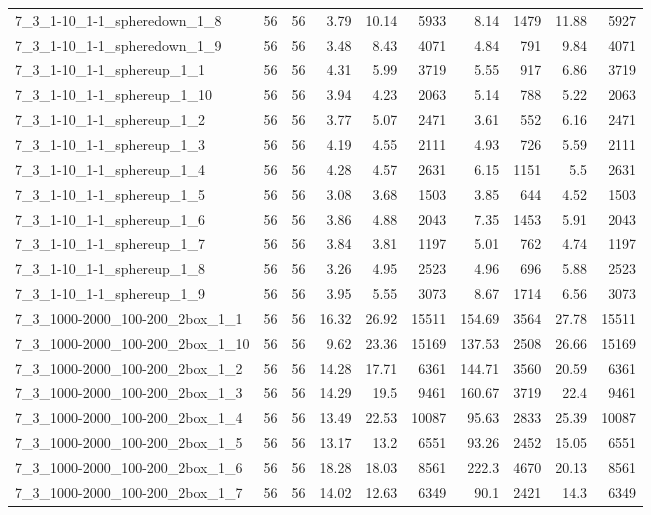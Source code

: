 \begin{center}
\begin{scriptsize}
\begin{longtable}{lrrrrrrrrr}
7\_3\_1-10\_1-1\_spheredown\_1\_8 & 56 & 56 & 3.79 & 10.14 & 5933 & 8.14 & 1479 & 11.88 & 5927\\
7\_3\_1-10\_1-1\_spheredown\_1\_9 & 56 & 56 & 3.48 & 8.43 & 4071 & 4.84 & 791 & 9.84 & 4071\\
7\_3\_1-10\_1-1\_sphereup\_1\_1 & 56 & 56 & 4.31 & 5.99 & 3719 & 5.55 & 917 & 6.86 & 3719\\
7\_3\_1-10\_1-1\_sphereup\_1\_10 & 56 & 56 & 3.94 & 4.23 & 2063 & 5.14 & 788 & 5.22 & 2063\\
7\_3\_1-10\_1-1\_sphereup\_1\_2 & 56 & 56 & 3.77 & 5.07 & 2471 & 3.61 & 552 & 6.16 & 2471\\
7\_3\_1-10\_1-1\_sphereup\_1\_3 & 56 & 56 & 4.19 & 4.55 & 2111 & 4.93 & 726 & 5.59 & 2111\\
7\_3\_1-10\_1-1\_sphereup\_1\_4 & 56 & 56 & 4.28 & 4.57 & 2631 & 6.15 & 1151 & 5.5 & 2631\\
7\_3\_1-10\_1-1\_sphereup\_1\_5 & 56 & 56 & 3.08 & 3.68 & 1503 & 3.85 & 644 & 4.52 & 1503\\
7\_3\_1-10\_1-1\_sphereup\_1\_6 & 56 & 56 & 3.86 & 4.88 & 2043 & 7.35 & 1453 & 5.91 & 2043\\
7\_3\_1-10\_1-1\_sphereup\_1\_7 & 56 & 56 & 3.84 & 3.81 & 1197 & 5.01 & 762 & 4.74 & 1197\\
7\_3\_1-10\_1-1\_sphereup\_1\_8 & 56 & 56 & 3.26 & 4.95 & 2523 & 4.96 & 696 & 5.88 & 2523\\
7\_3\_1-10\_1-1\_sphereup\_1\_9 & 56 & 56 & 3.95 & 5.55 & 3073 & 8.67 & 1714 & 6.56 & 3073\\
7\_3\_1000-2000\_100-200\_2box\_1\_1 & 56 & 56 & 16.32 & 26.92 & 15511 & 154.69 & 3564 & 27.78 & 15511\\
7\_3\_1000-2000\_100-200\_2box\_1\_10 & 56 & 56 & 9.62 & 23.36 & 15169 & 137.53 & 2508 & 26.66 & 15169\\
7\_3\_1000-2000\_100-200\_2box\_1\_2 & 56 & 56 & 14.28 & 17.71 & 6361 & 144.71 & 3560 & 20.59 & 6361\\
7\_3\_1000-2000\_100-200\_2box\_1\_3 & 56 & 56 & 14.29 & 19.5 & 9461 & 160.67 & 3719 & 22.4 & 9461\\
7\_3\_1000-2000\_100-200\_2box\_1\_4 & 56 & 56 & 13.49 & 22.53 & 10087 & 95.63 & 2833 & 25.39 & 10087\\
7\_3\_1000-2000\_100-200\_2box\_1\_5 & 56 & 56 & 13.17 & 13.2 & 6551 & 93.26 & 2452 & 15.05 & 6551\\
7\_3\_1000-2000\_100-200\_2box\_1\_6 & 56 & 56 & 18.28 & 18.03 & 8561 & 222.3 & 4670 & 20.13 & 8561\\
7\_3\_1000-2000\_100-200\_2box\_1\_7 & 56 & 56 & 14.02 & 12.63 & 6349 & 90.1 & 2421 & 14.3 & 6349\\

\end{longtable}
\end{scriptsize}
\end{center}
